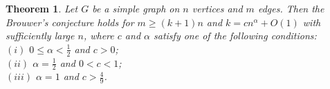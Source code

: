 \documentclass[12pt]{article}
\newtheorem{theorem}{Theorem}[section]
\newtheorem{conjecture}[theorem]{Conjecture}
\begin{document}

\begin{theorem}\label{th6}
  Let $G$ be a simple graph on $n$ vertices and $m$ edges. Then the Brouwer's conjecture holds
  for $m\geq (k+1)n$ and $k=cn^{\alpha}+O(1)$ with sufficiently large $n$, where $c$ and $\alpha$ satisfy one of the following
  conditions:\\
 $(i)$ $0\leq\alpha<\frac{1}{2}$ and $c>0$;\\
 $(ii)$ $\alpha=\frac{1}{2}$ and $0<c<1$;\\
 $(iii)$ $\alpha=1$ and $c>\frac{4}{9}$.
\end{theorem}
\end{document}
